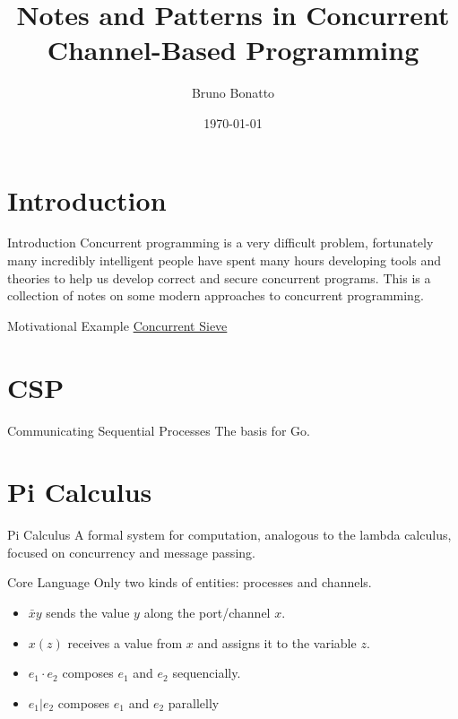 \documentclass[bigger]{beamer}
\author{Bruno Bonatto}
\date{\today}
\title{Notes and Patterns in Concurrent Channel-Based Programming}
\begin{document}
\maketitle

\section{Introduction}
\label{sec:orgdd19380}

\begin{frame}[label={sec:orgc68c724}]{Introduction}
Concurrent programming is a very difficult problem, fortunately many incredibly
intelligent people have spent many hours developing tools and theories to help
us develop correct and secure concurrent programs. This is a collection of notes
on some modern approaches to concurrent programming.
\end{frame}

\begin{frame}[label={sec:org6985a57}]{Motivational Example}
\href{https://github.com/bfbonatto/concurrency-presentation/blob/master/sieve.go}{Concurrent Sieve}
\end{frame}

\section{CSP}
\label{sec:org2b15e1b}

\begin{frame}[label={sec:org3fae2ae}]{Communicating Sequential Processes}
The basis for Go.
\end{frame}

\section{Pi Calculus}
\label{sec:org57debb8}

\begin{frame}[label={sec:orgce0476f}]{Pi Calculus}
A formal system for computation, analogous to the lambda calculus, focused
on concurrency and message passing.
\end{frame}

\begin{frame}[label={sec:orgd008e4d}]{Core Language}
Only two kinds of entities: processes and channels.

\begin{itemize}
\item \(\bar{x}y\) sends the value \(y\) along the port/channel \(x\).
\item \(x(z)\) receives a value from \(x\) and assigns it to the variable \(z\).
\item \(e_1\cdot e_2\) composes \(e_1\) and \(e_2\) sequencially.
\item \(e_1 | e_2\) composes \(e_1\) and \(e_2\) parallelly
\end{itemize}
\end{frame}
\end{document}

